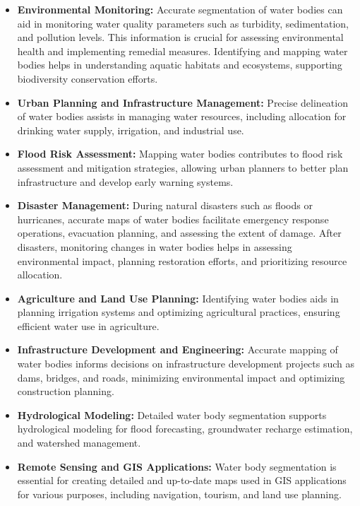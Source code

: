 \begin{itemize}
    \item \textbf{Environmental Monitoring:} Accurate segmentation of water bodies can aid in monitoring water quality parameters such as turbidity, sedimentation, and pollution levels. This information is crucial for assessing environmental health and implementing remedial measures.
    Identifying and mapping water bodies helps in understanding aquatic habitats and ecosystems, supporting biodiversity conservation efforts.
    \item \textbf{Urban Planning and Infrastructure Management: } Precise delineation of water bodies assists in managing water resources, including allocation for drinking water supply, irrigation, and industrial use.
    \item \textbf{Flood Risk Assessment: } Mapping water bodies contributes to flood risk assessment and mitigation strategies, allowing urban planners to better plan infrastructure and develop early warning systems.
    \item \textbf{Disaster Management:} During natural disasters such as floods or hurricanes, accurate maps of water bodies facilitate emergency response operations, evacuation planning, and assessing the extent of damage.
     After disasters, monitoring changes in water bodies helps in assessing environmental impact, planning restoration efforts, and prioritizing resource allocation.
     \item \textbf{Agriculture and Land Use Planning:} Identifying water bodies aids in planning irrigation systems and optimizing agricultural practices, ensuring efficient water use in agriculture.
     \item \textbf{Infrastructure Development and Engineering:} Accurate mapping of water bodies informs decisions on infrastructure development projects such as dams, bridges, and roads, minimizing environmental impact and optimizing construction planning.
     \item \textbf{Hydrological Modeling: }Detailed water body segmentation supports hydrological modeling for flood forecasting, groundwater recharge estimation, and watershed management.
     \item \textbf{Remote Sensing and GIS Applications: }Water body segmentation is essential for creating detailed and up-to-date maps used in GIS applications for various purposes, including navigation, tourism, and land use planning.
    
\end{itemize}

